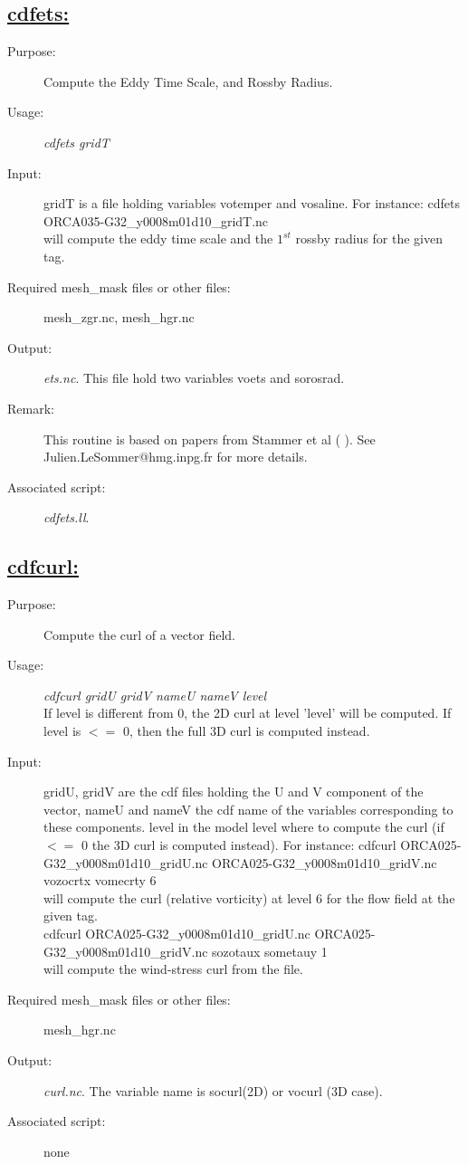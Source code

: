 \documentclass[a4paper,11pt]{article}
\begin{document}
\newpage
\subsection*{\underline{cdfets:}}
\begin{description}
\item[Purpose:] Compute the Eddy Time Scale, and Rossby Radius.
\item[Usage:] {\em cdfets gridT }
\item[Input:] gridT is a file holding variables votemper and vosaline.
For instance: cdfets  ORCA035-G32\_y0008m01d10\_gridT.nc  \\
will compute  the eddy time scale and the  $1^{st}$ rossby radius for the given tag.
\item[Required mesh\_mask files or other files:]mesh\_zgr.nc, mesh\_hgr.nc
\item[Output:] {\em ets.nc}. This file hold two variables voets and sorosrad.
\item[Remark:] This routine is based on papers from Stammer et al (   ). See Julien.LeSommer@hmg.inpg.fr for more
details.
\item[Associated script:] {\em cdfets.ll}. 
\end{description}

\newpage
\subsection*{\underline{cdfcurl:}}
\begin{description}
\item[Purpose:] Compute the curl of a vector field.
\item[Usage:] {\em cdfcurl gridU gridV nameU nameV level }\\
 If level is different from 0, the 2D curl at level 'level' will be computed. If level is $<=$ 0, then the full 3D curl
 is computed instead.
\item[Input:] gridU, gridV are the cdf files holding the U and V component of the vector, nameU and nameV the cdf name
of the variables corresponding to these components. level in the model level where to compute the curl (if $<=$ 0 the 3D
curl is computed instead).
For instance: cdfcurl   ORCA025-G32\_y0008m01d10\_gridU.nc ORCA025-G32\_y0008m01d10\_gridV.nc  vozocrtx vomecrty 6 \\
will compute  the curl (relative vorticity) at level 6 for the flow field at the given tag. \\
 cdfcurl   ORCA025-G32\_y0008m01d10\_gridU.nc ORCA025-G32\_y0008m01d10\_gridV.nc  sozotaux sometauy 1 \\
will compute the wind-stress curl from the file.

\item[Required mesh\_mask files or other files:] mesh\_hgr.nc
\item[Output:] {\em curl.nc}. The variable name is socurl(2D) or vocurl (3D case).
\item[Associated script:] none
\end{description}
\end{document}
